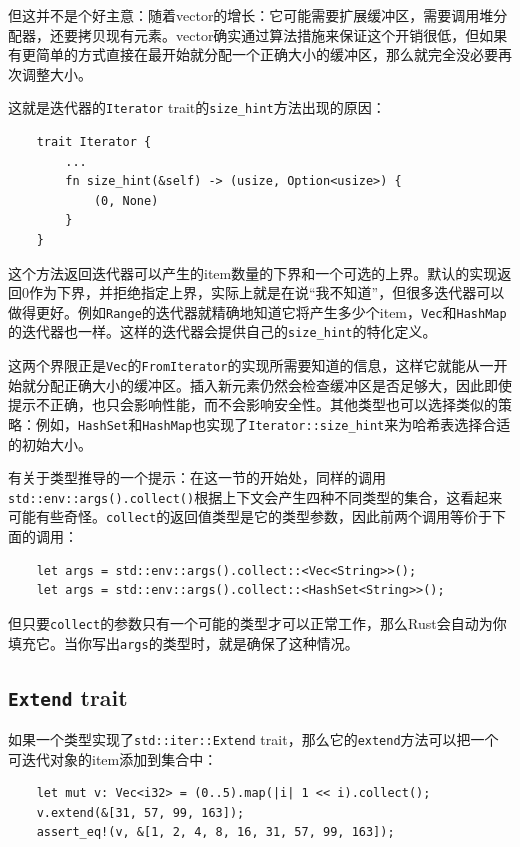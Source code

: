 但这并不是个好主意：随着vector的增长：它可能需要扩展缓冲区，需要调用堆分配器，还要拷贝现有元素。vector确实通过算法措施来保证这个开销很低，但如果有更简单的方式直接在最开始就分配一个正确大小的缓冲区，那么就完全没必要再次调整大小。

这就是迭代器的\texttt{Iterator} trait的\texttt{size\_hint}方法出现的原因：
\begin{verbatim}
    trait Iterator {
        ...
        fn size_hint(&self) -> (usize, Option<usize>) {
            (0, None)
        }
    }
\end{verbatim}

这个方法返回迭代器可以产生的item数量的下界和一个可选的上界。默认的实现返回0作为下界，并拒绝指定上界，实际上就是在说“我不知道”，但很多迭代器可以做得更好。例如\texttt{Range}的迭代器就精确地知道它将产生多少个item，\texttt{Vec}和\texttt{HashMap}的迭代器也一样。这样的迭代器会提供自己的\texttt{size\_hint}的特化定义。

这两个界限正是\texttt{Vec}的\texttt{FromIterator}的实现所需要知道的信息，这样它就能从一开始就分配正确大小的缓冲区。插入新元素仍然会检查缓冲区是否足够大，因此即使提示不正确，也只会影响性能，而不会影响安全性。其他类型也可以选择类似的策略：例如，\texttt{HashSet}和\texttt{HashMap}也实现了\texttt{Iterator::size\_hint}来为哈希表选择合适的初始大小。

有关于类型推导的一个提示：在这一节的开始处，同样的调用\texttt{std::env::args().collect()}根据上下文会产生四种不同类型的集合，这看起来可能有些奇怪。\texttt{collect}的返回值类型是它的类型参数，因此前两个调用等价于下面的调用：
\begin{verbatim}
    let args = std::env::args().collect::<Vec<String>>();
    let args = std::env::args().collect::<HashSet<String>>();
\end{verbatim}

但只要\texttt{collect}的参数只有一个可能的类型才可以正常工作，那么Rust会自动为你填充它。当你写出\texttt{args}的类型时，就是确保了这种情况。

\subsection{\texttt{Extend} trait}\label{extend}
如果一个类型实现了\texttt{std::iter::Extend} trait，那么它的\texttt{extend}方法可以把一个可迭代对象的item添加到集合中：
\begin{verbatim}
    let mut v: Vec<i32> = (0..5).map(|i| 1 << i).collect();
    v.extend(&[31, 57, 99, 163]);
    assert_eq!(v, &[1, 2, 4, 8, 16, 31, 57, 99, 163]);
\end{verbatim}

